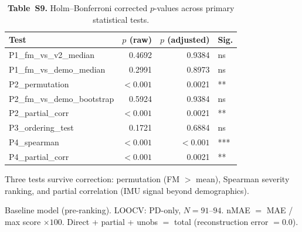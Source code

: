 \documentclass[11pt,a4paper]{article}
\newcommand{\tabnote}[1]{\par\vspace{2pt}\noindent\begin{minipage}{\linewidth}\small\itshape\raggedright #1\par\end{minipage}\par\vspace{0.4em}}
\begin{document}
\begin{table}[H]
\centering
\caption{\textbf{Table~S9.} Holm--Bonferroni corrected $p$-values across primary statistical tests.}
\label{tab:holm}
\begin{tabular}{lrrl}
\toprule
\textbf{Test} & \textbf{$p$ (raw)} & \textbf{$p$ (adjusted)} & \textbf{Sig.} \\
\midrule
P1\_fm\_vs\_v2\_median        & 0.4692   & 0.9384   & ns  \\
P1\_fm\_vs\_demo\_median      & 0.2991   & 0.8973   & ns  \\
P2\_permutation               & $<0.001$ & 0.0021   & **  \\
P2\_fm\_vs\_demo\_bootstrap   & 0.5924   & 0.9384   & ns  \\
P2\_partial\_corr             & $<0.001$ & 0.0021   & **  \\
P3\_ordering\_test            & 0.1721   & 0.6884   & ns  \\
P4\_spearman                  & $<0.001$ & $<0.001$ & *** \\
P4\_partial\_corr             & $<0.001$ & 0.0021   & **  \\
\bottomrule
\end{tabular}
\tabnote{Three tests survive correction: permutation (FM $>$ mean), Spearman severity ranking, and partial correlation (IMU signal beyond demographics).}
\end{table}

\begin{table}[H]
\centering
\caption{\textbf{Table~S10.} Three-level observability decomposition (baseline model, PD-only LOOCV).}
\label{tab:obsbaseline}
\small
{}%
\tabnote{Baseline model (pre-ranking). LOOCV: PD-only, $N=91$--$94$. nMAE $=$ MAE / max score $\times 100$. Direct + partial + unobs $=$ total (reconstruction error $=0.0$).}
\end{table}
\end{document}
